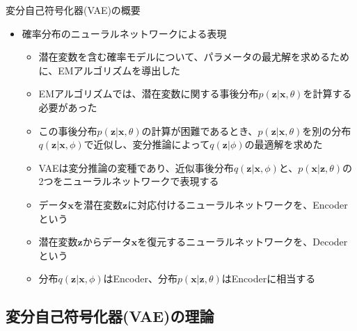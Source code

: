 \documentclass[dvipdfmx,notheorems,t]{beamer}
\begin{document}
\begin{frame}{変分自己符号化器(VAE)の概要}

\begin{itemize}
	\item 確率分布のニューラルネットワークによる表現
	\begin{itemize}
		\item 潜在変数を含む確率モデルについて、パラメータの最尤解を求めるために、EMアルゴリズムを導出した
		\item EMアルゴリズムでは、潜在変数に関する事後分布$p(\bm{z} | \bm{x}, \theta)$を計算する必要があった
		\item この事後分布$p(\bm{z} | \bm{x}, \theta)$の計算が困難であるとき、$p(\bm{z} | \bm{x}, \theta)$を別の分布$q(\bm{z} | \bm{x}, \phi)$で近似し、変分推論によって$q(\bm{z} | \phi)$の最適解を求めた
		\newline
		\item VAEは変分推論の変種であり、近似事後分布$q(\bm{z} | \bm{x}, \phi)$と、$p(\bm{x} | \bm{z}, \theta)$の2つを\alert{ニューラルネットワーク}で表現する
		\newline
		\item データ$\bm{x}$を潜在変数$\bm{z}$に対応付けるニューラルネットワークを、\alert{Encoder}という
		\item 潜在変数$\bm{z}$からデータ$\bm{x}$を復元するニューラルネットワークを、\alert{Decoder}という
		\item 分布$q(\bm{z} | \bm{x}, \phi)$は\alert{Encoder}、分布$p(\bm{x} | \bm{z}, \theta)$は\alert{Encoder}に相当する
	\end{itemize}
\end{itemize}

\end{frame}

\subsection{変分自己符号化器(VAE)の理論}
\end{document}
